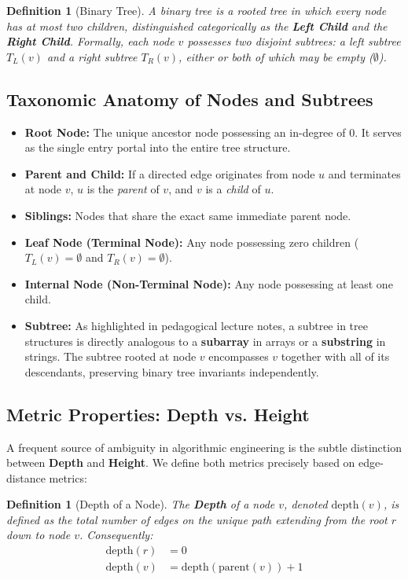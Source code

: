 \documentclass[10pt,journal,compsoc,onecolumn]{IEEEtran}
\newtheorem{definition}[theorem]{Definition}
\begin{document}
\begin{definition}[Binary Tree]
A \emph{binary tree} is a rooted tree in which every node has at most two children, distinguished categorically as the \textbf{Left Child} and the \textbf{Right Child}. Formally, each node $v$ possesses two disjoint subtrees: a left subtree $T_L(v)$ and a right subtree $T_R(v)$, either or both of which may be empty ($\emptyset$).
\end{definition}

\subsection{Taxonomic Anatomy of Nodes and Subtrees}

\begin{itemize}
    \item \textbf{Root Node:} The unique ancestor node possessing an in-degree of 0. It serves as the single entry portal into the entire tree structure.
    \item \textbf{Parent and Child:} If a directed edge originates from node $u$ and terminates at node $v$, $u$ is the \emph{parent} of $v$, and $v$ is a \emph{child} of $u$.
    \item \textbf{Siblings:} Nodes that share the exact same immediate parent node.
    \item \textbf{Leaf Node (Terminal Node):} Any node possessing zero children ($T_L(v) = \emptyset$ and $T_R(v) = \emptyset$).
    \item \textbf{Internal Node (Non-Terminal Node):} Any node possessing at least one child.
    \item \textbf{Subtree:} As highlighted in pedagogical lecture notes, a subtree in tree structures is directly analogous to a \textbf{subarray} in arrays or a \textbf{substring} in strings. The subtree rooted at node $v$ encompasses $v$ together with all of its descendants, preserving binary tree invariants independently.
\end{itemize}

\subsection{Metric Properties: Depth vs. Height}

A frequent source of ambiguity in algorithmic engineering is the subtle distinction between \textbf{Depth} and \textbf{Height}. We define both metrics precisely based on edge-distance metrics:

\begin{definition}[Depth of a Node]
The \textbf{Depth} of a node $v$, denoted $\mathrm{depth}(v)$, is defined as the total number of edges on the unique path extending from the root $r$ down to node $v$. Consequently:
\begin{align}
    \mathrm{depth}(r) &= 0 \\
    \mathrm{depth}(v) &= \mathrm{depth}(\mathrm{parent}(v)) + 1
\end{align}
\end{definition}
\end{document}
